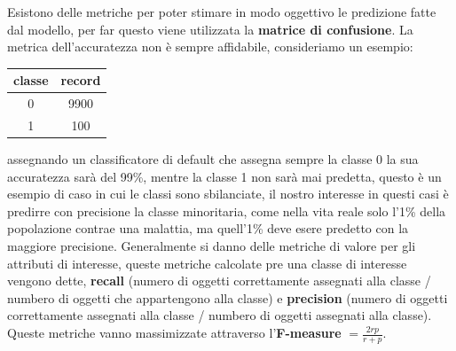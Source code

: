\documentclass[12pt]{article}
\begin{document}
Esistono delle metriche per poter stimare in modo oggettivo le predizione fatte dal modello, per far questo viene utilizzata la \textbf{matrice di confusione}.
La metrica  dell'accuratezza non \`e sempre affidabile, consideriamo un esempio: 
\begin{table}[H]
    \centering
    \begin{tabular}{|c|c|}
        \hline
        classe & record \\
        \hline
        0 & 9900 \\
        1 & 100 \\
        \hline
    \end{tabular}
\end{table}
assegnando un classificatore di default che assegna sempre la classe 0 la sua accuratezza sar\`a del 99\%, mentre la classe 1 non sar\`a mai predetta, questo \`e un esempio di caso in cui le classi sono sbilanciate, il nostro interesse in questi casi \`e predirre con precisione la classe minoritaria, come nella vita reale solo l'1\% della popolazione contrae una malattia, ma quell'1\% deve esere predetto con la maggiore precisione. Generalmente si danno delle metriche di valore per gli attributi di interesse, queste metriche calcolate pre una classe di interesse vengono dette, \textbf{recall} (numero di oggetti correttamente assegnati alla classe / numbero di oggetti che appartengono alla classe) e \textbf{precision} (numero di oggetti correttamente assegnati alla classe / numbero di oggetti assegnati alla classe). Queste metriche vanno massimizzate attraverso l'\textbf{F-measure} $= \frac{2rp}{r + p} $.
\end{document}
